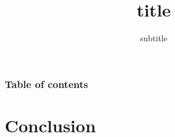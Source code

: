 \documentclass[9pt, xcolor=dvipsnames]{beamer}
\title[short]{title}
\subtitle{subtitle}
\begin{document}


\begin{frame}%
	\frametitle{Table of contents}
	\tableofcontents[hideallsubsections]   %
\end{frame}

% 


\section{Conclusion}




\end{document}
